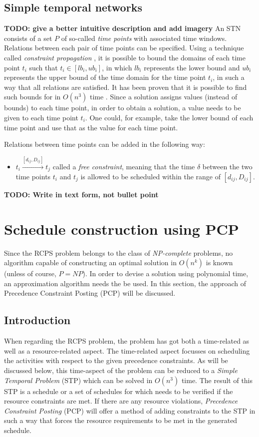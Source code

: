 \documentclass{article}
\newcommand{\TODO}[1]{{\color{red}\textbf{TODO: #1}}}
\begin{document}
\subsection{Simple temporal networks}
\label{text:STN}
\TODO{give a better intuitive description and add imagery}
An STN consists of a set $P$ of so-called \emph{time points} with associated time windows.
Relations between each pair of time points can be specified.
Using a technique called \emph{constraint propagation} \cite{policella07}, it is possible to bound the domains of each time point $t_i$ such that $t_i \in [lb_i, ub_i]$, in which $lb_i$ represents the lower bound and $ub_i$ represents the upper bound of the time domain for the time point $t_i$, in such a way that all relations are satisfied.
It has been proven that it is possible to find such bounds for in $O(n^3)$ time \cite{policella07}.
Since a solution assigns values (instead of bounds) to each time point, in order to obtain a solution, a value needs to be given to each time point $t_i$.
One could, for example, take the lower bound of each time point and use that as the value for each time point.

Relations between time points can be added in the following way:
\begin{itemize}
\item $t_i \xrightarrow{[d_{ij},D_{ij}]} t_j$ called a \emph{free constraint}, meaning that the time $\delta$ between the two time points $t_i$ and $t_j$ is allowed to be scheduled within the range of $[d_{ij},D_{ij}]$.
\end{itemize}
\TODO{Write in text form, not bullet point}

\newpage
\section{Schedule construction using PCP}
\label{section:PCP}
Since the RCPS problem belongs to the class of \emph{NP-complete} problems, no algorithm capable of constructing an optimal solution in $O(n^k)$ is known (unless of course, $P=NP$). In order to devise a solution using polynomial time, an approximation algorithm needs the be used. In this section, the approach of Precedence Constraint Posting (PCP) will be discussed.

\subsection{Introduction}
When regarding the RCPS problem, the problem has got both a time-related as well as a resource-related aspect. 
The time-related aspect focusses on scheduling the activities with respect to the given precedence constraints. 
As will be discussed below, this time-aspect of the problem can be reduced to a \emph{Simple Temporal Problem} (STP) \cite{lombardi10} which can be solved in $O(n^3)$ time. 
The result of this STP is a schedule or a set of schedules for which needs to be verified if the resource constraints are met. 
If there are any resource violations, \emph{Precedence Constraint Posting} (PCP) will offer a method of adding constraints to the STP in such a way that forces the resource requirements to be met in the generated schedule. 
\end{document}
